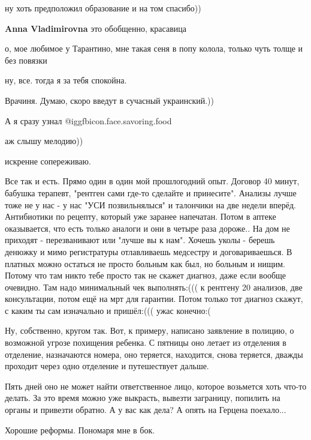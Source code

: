 \begin{itemize}
\begin{itemize}
ну хоть предположил образование и на том спасибо))

\textbf{Anna Vladimirovna} это обобщенно, красавица

о, мое любимое у Тарантино, мне такая сеня в попу колола, только чуть толще и без повязки

ну, все. тогда я за тебя спокойна.

Врачиня. Думаю, скоро введут в сучасный украинский.))

А я сразу узнал  @igg{fbicon.face.savoring.food} 

аж слышу мелодию))

\end{itemize} %

искренне сопереживаю.


Все так и есть. Прямо один в один мой прошлогодний опыт. Договор 40 минут,
бабушка терапевт, "рентген сами где-то сделайте и принесите". Анализы лучше
тоже не у нас - у нас "УСИ позвильнялыся" и талончики на две недели вперёд.
Антибиотики по рецепту, который уже заранее напечатан. Потом в аптеке
оказывается, что есть только аналоги и они в четыре раза дороже.. На дом не
приходят - перезванивают или "лучше вы к нам". Хочешь уколы - берешь денюжку и
мимо регистратуры отлавливаешь медсестру и договариваешься. В платных можно
остаться не просто больным как был, но больным и нищим. Потому что там никто
тебе просто так не скажет диагноз, даже если вообще очевидно. Там надо
минимальный чек выполнять:((( к рентгену 20 анализов, две консультации, потом
ещё на мрт для гарантии. Потом только тот диагноз скажут, с каким ты сам
изначально и пришёл:((( ужас конечно:(


Ну, собственно, кругом так. Вот, к примеру, написано заявление в полицию, о
возможной угрозе похищения ребенка. С пятницы оно летает из отделения в
отделение, назначаются номера, оно теряется, находится, снова теряется, дважды
проходит через одно отделение и путешествует дальше.

Пять дней оно не может найти ответственное лицо, которое возьмется хоть что-то
делать. За это время можно уже выкрасть, вывезти заграницу, попилить на органы
и привезти обратно. А у вас как дела? А опять на Герцена поехало...

Хорошие реформы. Пономаря мне в бок.


\end{itemize}
